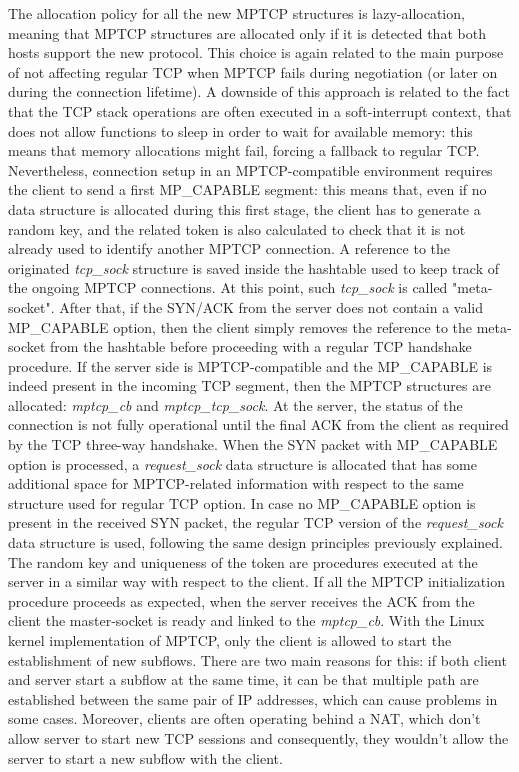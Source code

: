 The allocation policy for all the new MPTCP structures is lazy-allocation, meaning that MPTCP structures are allocated only if it is detected that both hosts support the new protocol. This choice is again related to the main purpose of not affecting regular TCP when MPTCP fails during negotiation (or later on during the connection lifetime). A downside of this approach is related to the fact that the TCP stack operations are often executed in a soft-interrupt context, that does not allow functions to sleep in order to wait for available memory: this means that memory allocations might fail, forcing a fallback to regular TCP.
Nevertheless, connection setup in an MPTCP-compatible environment requires the client to send a first MP\_CAPABLE segment: this means that, even if no data structure is allocated during this first stage, the client has to generate a random key, and the related token is also calculated to check that it is not already used to identify another MPTCP connection. A reference to the originated \textit{tcp\_sock} structure is saved inside the hashtable used to keep track of the ongoing MPTCP connections. At this point, such \textit{tcp\_sock} is called "meta-socket". After that, if the SYN/ACK from the server does not contain a valid MP\_CAPABLE option, then the client simply removes the reference to the meta-socket from the hashtable before proceeding with a regular TCP handshake procedure. If the server side is MPTCP-compatible and the MP\_CAPABLE is indeed present in the incoming TCP segment, then the MPTCP structures are allocated: \textit{mptcp\_cb} and \textit{mptcp\_tcp\_sock}.
At the server, the status of the connection is not fully operational until the final ACK from the client as required by the TCP three-way handshake. When the SYN packet with MP\_CAPABLE option is processed, a \textit{request\_sock} data structure is allocated that has some additional space for MPTCP-related information with respect to the same structure used for regular TCP option. In case no MP\_CAPABLE option is present in the received SYN packet, the regular TCP version of the \textit{request\_sock} data structure is used, following the same design principles previously explained. The random key and uniqueness of the token are procedures executed at the server in a similar way with respect to the client. If all the MPTCP initialization procedure proceeds as expected, when the server receives the ACK from the client the master-socket is ready and linked to the \textit{mptcp\_cb}.
With the Linux kernel implementation of MPTCP, only the client is allowed to start the establishment of new subflows. There are two main reasons for this: if both client and server start a subflow at the same time, it can be that multiple path are established between the same pair of IP addresses, which can cause problems in some cases. Moreover, clients are often operating behind a NAT, which don't allow server to start new TCP sessions and consequently, they wouldn't allow the server to start a new subflow with the client.

